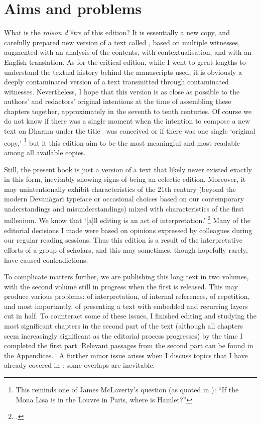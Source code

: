 

\section{Aims and problems}
\frenchspacing

\noindent
What is the \textit{raison d'\^etre} of this edition? 
It is essentially a new copy, and carefully prepared new version
of a text called \Vss, based on multiple witnesses,
augmented with an analysis of the contents, with
contextualisation, and with an English translation.
As for the critical edition, while I went to great 
lengths to understand the textual history behind 
the manuscripts used, it is obviously a deeply contaminated 
version of a text transmitted through contaminated witnesses.
Nevertheless, I hope that this version is as 
close as possible to the authors' and redactors' original intentions at the time of assembling these chapters together, approximately in the seventh to tenth centuries. 
Of course we do not know if there was a single moment
when the intention to compose a new text on Dharma
under the title \Vss\ was conceived or if there was one single
`original copy,'%
		\footnote{This reminds one of James McLaverty's
                  question (as quoted in
   				  ):
                 ``If the Mona Lisa is in the Louvre in Paris, where is Hamlet?''}
but it this edition aim to be the most meaningful and most readable among all available copies. 

Still, the present book is just a
version of a text that likely never existed exactly 
in this form, inevitably showing
signs of being an eclectic edition. 
Moreover, it may unintentionally exhibit 
characteristics of the 21th century 
(beyond the modern Devanāgarī typeface
or occasional choices based on our contemporary
understandings and misunderstandings) 
mixed with characteristics of the first millenium. 
We know that `[a]ll editing is an act of interpretation.'%
		\footnote{.}
Many of the editorial decisions I made were based
on opinions expressed by colleagues during our
regular reading sessions. Thus this edition is a result
of the interpretative efforts of a group of scholars, and
this may sometimes, though hopefully rarely, have caused contradictions.

To complicate matters further, we are publishing this long text
in two volumes, with the second volume still in progress
when the first is released. This may produce various problems:
of interpretation, of internal references, of repetition, 
and most importantly, of presenting a text with
embedded and recurring layers cut in half. To counteract
some of these issues, I finished editing and 
studying the most significant chapters in 
the second part of the text (although all chapters seem 
increasingly significant as the editorial process progresses)
by the time I completed the first part. 
Relevant passages from the second part can be found in 
the Appendices. \CHECK\ A further minor issue arises when
I discuss topics that I have already covered in
: some overlaps are inevitable.

